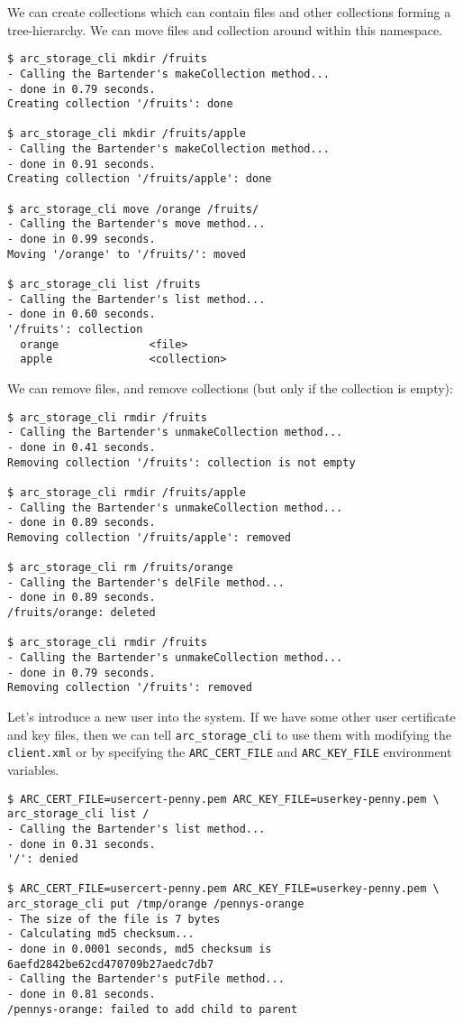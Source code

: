 \documentclass{book}
\begin{document}
We can create collections which can contain files and other collections forming a tree-hierarchy. We can move files and collection around within this namespace.

\begin{verbatim}
$ arc_storage_cli mkdir /fruits
- Calling the Bartender's makeCollection method...
- done in 0.79 seconds.
Creating collection '/fruits': done

$ arc_storage_cli mkdir /fruits/apple
- Calling the Bartender's makeCollection method...
- done in 0.91 seconds.
Creating collection '/fruits/apple': done

$ arc_storage_cli move /orange /fruits/
- Calling the Bartender's move method...
- done in 0.99 seconds.
Moving '/orange' to '/fruits/': moved

$ arc_storage_cli list /fruits
- Calling the Bartender's list method...
- done in 0.60 seconds.
'/fruits': collection
  orange              <file>
  apple               <collection>
\end{verbatim}

We can remove files, and remove collections (but only if the collection is empty):

\begin{verbatim}
$ arc_storage_cli rmdir /fruits
- Calling the Bartender's unmakeCollection method...
- done in 0.41 seconds.
Removing collection '/fruits': collection is not empty

$ arc_storage_cli rmdir /fruits/apple
- Calling the Bartender's unmakeCollection method...
- done in 0.89 seconds.
Removing collection '/fruits/apple': removed

$ arc_storage_cli rm /fruits/orange
- Calling the Bartender's delFile method...
- done in 0.89 seconds.
/fruits/orange: deleted

$ arc_storage_cli rmdir /fruits
- Calling the Bartender's unmakeCollection method...
- done in 0.79 seconds.
Removing collection '/fruits': removed
\end{verbatim}

Let's introduce a new user into the system. If we have some other user certificate and key files, then we can tell \verb!arc_storage_cli! to use them with modifying the \verb!client.xml! or by specifying the \verb!ARC_CERT_FILE! and \verb!ARC_KEY_FILE! environment variables.

\begin{verbatim}
$ ARC_CERT_FILE=usercert-penny.pem ARC_KEY_FILE=userkey-penny.pem \
arc_storage_cli list /
- Calling the Bartender's list method...
- done in 0.31 seconds.
'/': denied

$ ARC_CERT_FILE=usercert-penny.pem ARC_KEY_FILE=userkey-penny.pem \
arc_storage_cli put /tmp/orange /pennys-orange
- The size of the file is 7 bytes
- Calculating md5 checksum...
- done in 0.0001 seconds, md5 checksum is 6aefd2842be62cd470709b27aedc7db7
- Calling the Bartender's putFile method...
- done in 0.81 seconds.
/pennys-orange: failed to add child to parent

\end{verbatim}
\end{document}
